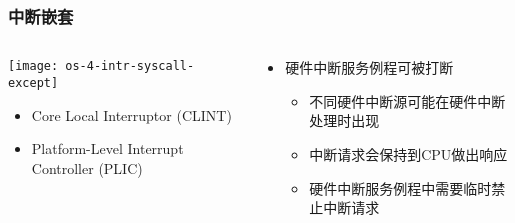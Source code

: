 \begin{frame}[plain,t]
	\frametitle{中断嵌套}
	\begin{columns}
		
		\begin{column}{0.4\textwidth}
			\centering
			\texttt{[image: os-4-intr-syscall-except]}
			\begin{itemize} \small
				\item Core Local	Interruptor (CLINT)
				\item Platform-Level Interrupt Controller (PLIC)
			\end{itemize}
			
		\end{column}
		
		\begin{column}{0.5\textwidth}
			
			\centering
			
			\begin{itemize} \small 
				\item 硬件中断服务例程可被打断	
				\begin{itemize} \small										
					\item 不同硬件中断源可能在硬件中断处理时出现
					\item 中断请求会保持到CPU做出响应
					\item 硬件中断服务例程中需要临时禁止中断请求
				\end{itemize}
			\end{itemize}
			
		\end{column}
		
	\end{columns}
	
\end{frame}	


